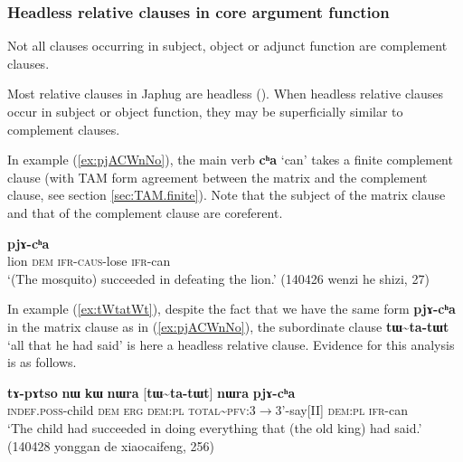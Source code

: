 \documentclass[oneside,a4paper,11pt]{article}
\newcommand{\ipa}[1]{\textbf{\phon#1}} %
\newcommand{\jpg}[2]{\ipa{#1} `#2'} %
\newcommand{\tld}{\textasciitilde{}}
\begin{document}
  \subsubsection{Headless relative clauses in core argument function}   \label{sec:relative}
Not all clauses occurring in subject, object or adjunct function are complement clauses. 

Most relative clauses in Japhug are headless  (\citealt{jacques16relatives}). When headless relative clauses occur in subject or object function, they may be superficially similar to complement clauses.

In example (\ref{ex:pjACWnNo}), the main verb \jpg{cʰa}{can} takes a finite complement clause (with TAM form agreement between the matrix and the complement clause, see section \ref{sec:TAM.finite}). Note that the subject of the matrix clause and that of the complement clause are coreferent.

\begin{exe}
\ex \label{ex:pjACWnNo}
\gll [\ipa{sɯŋgi} 	\ipa{nɯ} 	\ipa{pjɤ-ɕɯ-nŋo}] 	\ipa{pjɤ-cʰa} \\
lion \textsc{dem} \textsc{ifr-caus}-lose \textsc{ifr}-can \\
\glt `(The mosquito) succeeded in defeating the lion.' (140426 wenzi he shizi, 27)
\end{exe}

In example (\ref{ex:tWtatWt}), despite the fact that we have the same form \ipa{pjɤ-cʰa} in the matrix clause as in (\ref{ex:pjACWnNo}), the subordinate clause \ipa{tɯ\tld{}ta-tɯt} `all that he had said' is here a headless relative clause. Evidence for this analysis is as follows.

\begin{exe}
\ex \label{ex:tWtatWt}
\gll 
\ipa{tɤ-pɤtso} 	\ipa{nɯ} \ipa{kɯ}	\ipa{nɯra} 	[\ipa{tɯ\tld{}ta-tɯt}] 	\ipa{nɯra} 	\ipa{pjɤ-cʰa} \\
\textsc{indef.poss}-child \textsc{dem} \textsc{erg} \textsc{dem:pl} \textsc{total\tld{}pfv}:3$\rightarrow$3'-say[II] \textsc{dem:pl} \textsc{ifr}-can \\
\glt `The child had succeeded in doing everything that (the old king) had said.' (140428 yonggan de xiaocaifeng, 256)
\end{exe}
\end{document}
